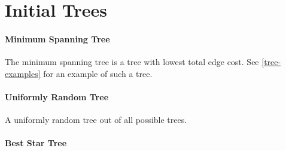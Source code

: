 \documentclass[a4paper, oneside]{discothesis}
\begin{document}
%


\section{Initial Trees}
\label{initial-trees}

\paragraph{Minimum Spanning Tree}\label{tree:mst}

The minimum spanning tree is a tree with lowest total edge cost. See \autoref{tree-examples} for an example of such a tree.

\paragraph{Uniformly Random Tree}\label{tree:random}

A uniformly random tree out of all possible trees.

\paragraph{Best Star Tree}\label{tree:star}
\end{document}
